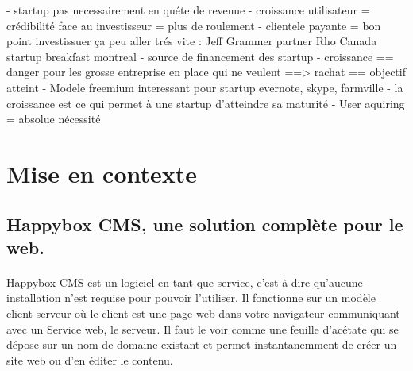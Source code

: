 \documentclass[11pt, a4paper ]{article}
\let\stdsection\section
\renewcommand\section{\newpage\stdsection}
\begin{document}
\begin{spacing}{1.5}
- startup pas necessairement en quéte de revenue
- croissance utilisateur = crédibilité face au investisseur = plus de roulement
- clientele payante = bon point investissuer ça peu aller trés vite : Jeff Grammer partner Rho Canada startup breakfast montreal
- source de financement des startup
- croissance == danger pour les grosse entreprise en place qui ne veulent ==> rachat == objectif atteint
- Modele freemium interessant pour startup evernote, skype, farmville
- la croissance est ce qui permet à une startup d'atteindre sa maturité
- User aquiring = absolue nécessité








		\section{Mise en contexte} %

			\subsection{Happybox CMS, une solution complète pour le web.}

\paragraph{}
Happybox CMS est un logiciel en tant que service, c'est à dire qu'aucune installation n'est requise pour pouvoir l'utiliser. Il fonctionne sur un modèle client-serveur où le client est une page web dans votre navigateur communiquant avec un Service web, le serveur. Il faut le voir comme une feuille d'acétate qui se dépose sur un nom de domaine existant et permet instantanemment de créer un site web ou d'en éditer le contenu.


\end{spacing}
\end{document}
